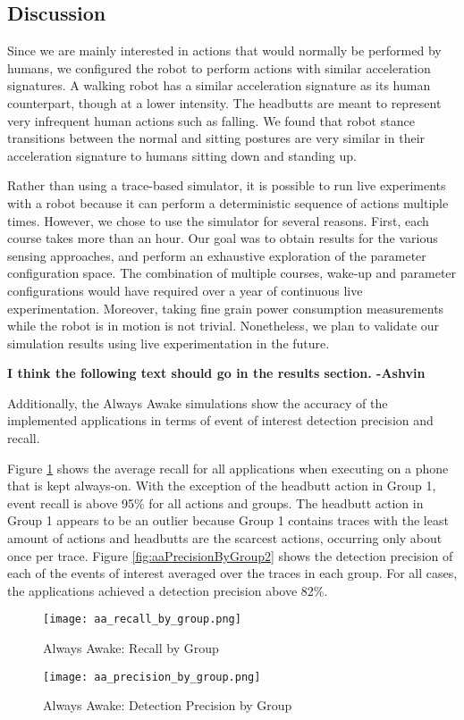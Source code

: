 \subsection{Discussion}

Since we are mainly interested in actions that would normally be
performed by humans, we configured the robot to perform actions with
similar acceleration signatures. A walking robot has a similar
acceleration signature as its human counterpart, though at a lower
intensity. The headbutts are meant to represent very infrequent human
actions such as falling. We found that robot stance transitions
between the normal and sitting postures are very similar in their
acceleration signature to humans sitting down and standing up.

Rather than using a trace-based simulator, it is possible to run live
experiments with a robot because it can perform a deterministic
sequence of actions multiple times. However, we chose to use the
simulator for several reasons. First, each course takes more than an
hour. Our goal was to obtain results for the various sensing
approaches, and perform an exhaustive exploration of the parameter
configuration space. The combination of multiple courses, wake-up and
parameter configurations would have required over a year of continuous
live experimentation. Moreover, taking fine grain power consumption
measurements while the robot is in motion is not trivial.
Nonetheless, we plan to validate our simulation results using live
experimentation in the future.

\textbf{I think the following text should go in the results section. -Ashvin}

Additionally, the Always Awake simulations show
the accuracy of the implemented applications in terms of event of
interest detection precision and recall. 


Figure \ref{fig:aaRecallByGroup} shows the average recall for all
applications when executing on a phone that is kept always-on.  With
the exception of the headbutt action in Group 1, event recall is above
95\% for all actions and groups. The headbutt action in Group 1
appears to be an outlier because Group 1 contains traces with the
least amount of actions and headbutts are the scarcest actions,
occurring only about once per trace. Figure
\ref{fig:aaPrecisionByGroup2} shows the detection precision of each of
the events of interest averaged over the traces in each group. For all
cases, the applications achieved a detection precision above 82\%.



\begin{figure}[t]
	\texttt{[image: aa\_recall\_by\_group.png]}
	\caption{Always Awake: Recall by Group}
    	\label{fig:aaRecallByGroup}
\end{figure}


\begin{figure}[t]
	\texttt{[image: aa\_precision\_by\_group.png]}
	\caption{Always Awake: Detection Precision by Group}
    	\label{fig:aaPrecisionByGroup}
\end{figure}


